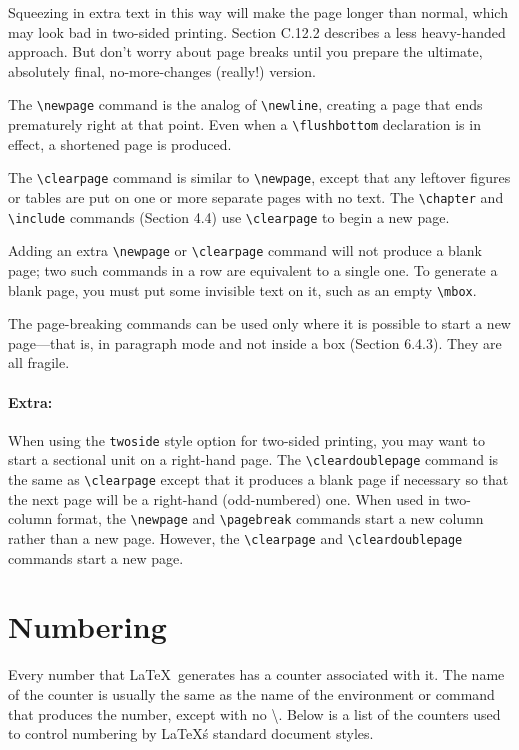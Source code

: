 \documentclass{article}
\newcommand{\justtext}[1]{\texttt{\textbackslash #1}}
\begin{document}
Squeezing in extra text in this way will make the page longer than normal, which may look bad in two-sided printing. Section C.12.2 describes a less heavy-handed approach. But don't worry about page breaks until you prepare the ultimate, absolutely final, no-more-changes (really!) version.

The \justtext{newpage} command is the analog of \justtext{newline}, creating a page that ends prematurely right at that point. Even when a \justtext{flushbottom} declaration is in effect, a shortened page is produced.

The \justtext{clearpage} command is similar to \justtext{newpage}, except that any leftover figures or tables are put on one or more separate pages with no text. The \justtext{chapter} and \justtext{include} commands (Section 4.4) use \justtext{clearpage} to begin a new page.

Adding an extra \justtext{newpage} or \justtext{clearpage} command will not produce a blank page; two such commands in a row are equivalent to a single one. To generate a blank page, you must put some invisible text on it, such as an empty \justtext{mbox}.

The page-breaking commands can be used only where it is possible to start a new page---that is, in paragraph mode and not inside a box (Section 6.4.3). They are all fragile.

\paragraph{Extra:} When using the {\tt twoside} style option for two-sided printing, you may want to start a sectional unit on a right-hand page. The \justtext{cleardoublepage} command is the same as \justtext{clearpage} except that it produces a blank page if necessary so that the next page will be a right-hand (odd-numbered) one. When used in two-column format, the \justtext{newpage} and \justtext{pagebreak} commands start a new column rather than a new page. However, the \justtext{clearpage} and \justtext{cleardoublepage} commands start a new page.


\section{Numbering}

Every number that \LaTeX\ generates has a counter associated with it. The name of the counter is usually the same as the name of the environment or command that produces the number, except with no \textbackslash. Below is a list of the counters used to control numbering by \LaTeX\'s standard document styles.
\end{document}
